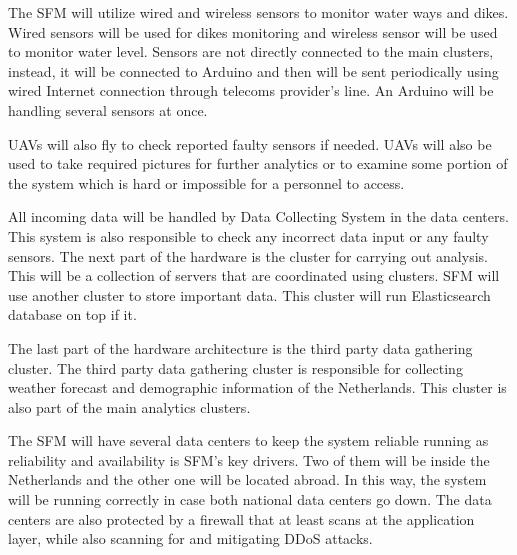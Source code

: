 The SFM will utilize wired and wireless sensors to monitor water ways and dikes. Wired sensors will be used for dikes monitoring and wireless sensor will be used to monitor water level. Sensors are not directly connected to the main clusters, instead, it will be connected to Arduino and then will be sent periodically using wired Internet connection through telecoms provider's line. An Arduino will be handling several sensors at once.

UAVs will also fly to check reported faulty sensors if needed. UAVs will also be used to take required pictures for further analytics or to examine some portion of the system which is hard or impossible for a personnel to access.

All incoming data will be handled by Data Collecting System in the data centers. This system is also responsible to check any incorrect data input or any faulty sensors. The next part of the hardware is the cluster for carrying out analysis. This will be a collection of servers that are coordinated using clusters. SFM will use another cluster to store important data. This cluster will run Elasticsearch database on top if it.

The last part of the hardware architecture is the third party data gathering cluster. The third party data gathering cluster is responsible for collecting weather forecast and demographic information of the Netherlands. This cluster is also part of the main analytics clusters.

The SFM will have several data centers to keep the system reliable running as reliability and availability is SFM's key drivers. Two of them will be inside the Netherlands and the other one will be located abroad. In this way, the system will be running correctly in case both national data centers go down. The data centers are also protected by a firewall that at least scans at the application layer, while also scanning for and mitigating DDoS attacks.